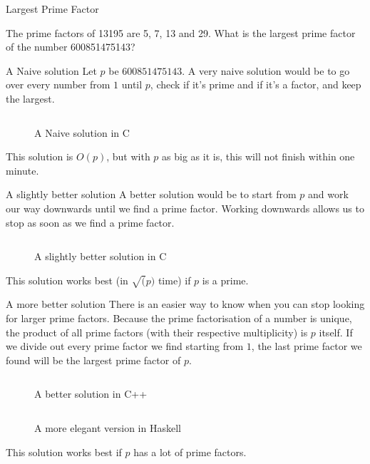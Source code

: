 \documentclass[main.tex]{subfiles}
\begin{document}
\begin{prob}{3}{Largest Prime Factor}
  \begin{problem}
    The prime factors of 13195 are 5, 7, 13 and 29.
    What is the largest prime factor of the number 600851475143?
  \end{problem}

  \begin{solutions}
    \begin{solution}{A Naive solution}
      Let $p$ be $600851475143$.
      A very naive solution would be to go over every number from $1$ until $p$, check if it's prime and if it's a factor, and keep the largest.
      \begin{figure}[H]
        \inputminted[firstline=19, lastline=28]{c}{\sol{003}{c}/naive.c}
        \caption{A Naive solution in C}
      \end{figure}
      This solution is $O(p)$, but with $p$ as big as it is, this will not finish within one minute.
    \end{solution}

    \begin{solution}{A slightly better solution}
      A better solution would be to start from $p$ and work our way downwards until we find a prime factor.
      Working downwards allows us to stop as soon as we find a prime factor.
      \begin{figure}[H]
        \inputminted[firstline=19, lastline=27]{c}{\sol{003}{c}/better.c}
        \caption{A slightly better solution in C}
      \end{figure}
      This solution works best (in $\sqrt(p)$ time) if $p$ is a prime.
    \end{solution}

    \begin{solution}{A more better solution}
      There is an easier way to know when you can stop looking for larger prime factors.
      Because the prime factorisation of a number is unique, the product of all prime factors (with their respective multiplicity) is $p$ itself.
      If we divide out every prime factor we find starting from $1$, the last prime factor we found will be the largest prime factor of $p$.

      \begin{figure}[H]
        \inputminted[firstline=17, lastline=28]{c++}{\sol{003}{c++}/solution.cc}
        \caption{A better solution in C++}
      \end{figure}
      \begin{figure}[H]
        \inputminted[firstline=6, lastline=7]{haskell}{\sol{003}{haskell}/solution.hs}
        \caption{A more elegant version in Haskell}
      \end{figure}
      This solution works best if $p$ has a lot of prime factors.
    \end{solution}
  \end{solutions}
\end{prob}
\end{document}
